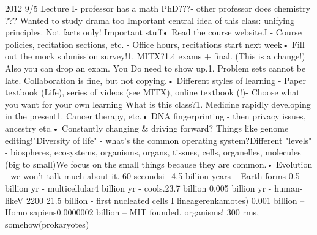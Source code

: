 2012
9/5
Lecture I- professor has a math PhD???- other professor does chemistry ??? Wanted to study drama too
Important central idea of this class: unifying
principles.
Not facts
only!
Important stuff• Read the course website.I - Course policies, recitation sections, etc.
- Office hours, recitations start next week• Fill out the mock submission survey!1. MITX?1.4 exams + final. (This is a change!) Also you can drop an exam.
You Do need to show up.1. Problem sets cannot be late. Collaboration is fine, but not copying.• Different styles of learning
- Paper textbook (Life), series of videos (see MITX), online textbook (!)- Choose what you want for your own learning
What is this class?1. Medicine rapidly developing in the present1. Cancer therapy, etc.• DNA fingerprinting - then privacy issues, ancestry etc.• Constantly changing & driving forward? Things like genome editing!"Diversity of life" - what's the common operating system?Different "levels" - biospheres, ecosystems, organisms, organs, tissues, cells,
organelles, molecules (big to small)We focus on the small things because they are common.• Evolution - we won't talk much about it. 60 secondsi– 4.5 billion years – Earth forms
0.5 billion yr - multicellular4 billion yr - cools.23.7 billion
0.005 billion yr - human-likeV 2200 21.5 billion - first nucleated cells I
lineagerenkamotes)
0.001 billion – Homo sapiens0.0000002 billion – MIT founded.
organisms!
300
rms, somehow(prokaryotes)
